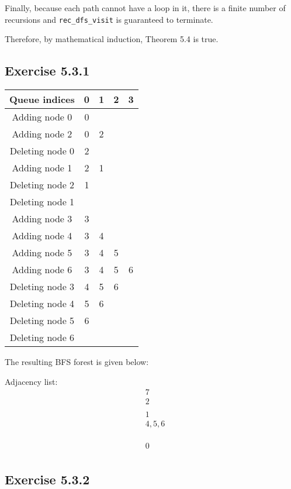 \documentclass{article}
\begin{document}
Finally, because each path cannot have a loop in it, there is a finite number of recursions and \texttt{rec\_dfs\_visit} is guaranteed to terminate.

Therefore, by mathematical induction, Theorem 5.4 is true.


\subsection*{Exercise 5.3.1}

\begin{tabular}{|c|c|c|c|c|}
\hline
Queue indices& 0& 1& 2& 3 \\
\hline
Adding node 0& 0& & & \\
\hline
Adding node 2& 0& 2& & \\
\hline
Deleting node 0& 2& & & \\
\hline
Adding node 1& 2& 1& & \\
\hline
Deleting node 2& 1& & & \\
\hline
Deleting node 1& & & & \\
\hline
Adding node 3& 3& & & \\
\hline
Adding node 4& 3& 4& & \\
\hline
Adding node 5& 3& 4& 5& \\
\hline
Adding node 6& 3& 4& 5& 6 \\
\hline
Deleting node 3& 4& 5& 6 & \\
\hline
Deleting node 4& 5& 6 & & \\
\hline
Deleting node 5& 6 & & & \\
\hline
Deleting node 6& & & & \\
\hline
\end{tabular}

The resulting BFS forest is given below:

Adjacency list:
\begin{align*}
&7 \\
&2 \\
& \\
&1 \\
&4,5,6 \\
& \\
& \\
& \\
&0 \\
\end{align*}

\subsection*{Exercise 5.3.2}
\end{document}
